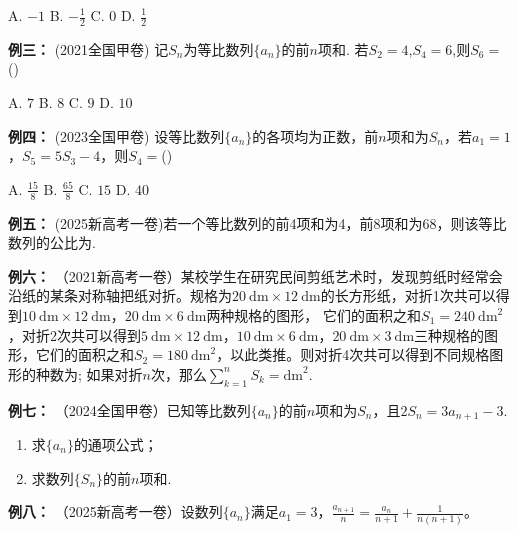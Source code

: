 \documentclass{article}
\begin{document}
\vspace{1em}
A. $-1$ \quad
B. $-\frac{1}{2}$ \quad
C. $0$ \quad
D. $\frac{1}{2}$
\vspace{2\baselineskip}


 \noindent \textbf{例三： }(2021全国甲卷) 记$S_n$为等比数列$\{a_n\}$的前$n$项和. 若$S_2=4$,$S_4=6$,则$S_6=$(\;\;\;)

\vspace{1em}
A. $7$ \quad
B. $8$ \quad
C. $9$ \quad
D. $10$
\vspace{2\baselineskip}

\noindent \textbf{例四： }(2023全国甲卷) 设等比数列$\{a_n\}$的各项均为正数，前$n$项和为$S_n$，若$a_1 = 1$，$S_5 = 5S_3 - 4$，则$S_4 =$(\;\;\;)

\vspace{1em}
A. $\frac{15}{8}$ \quad
B. $\frac{65}{8}$ \quad
C. $15$ \quad
D. $40$
\vspace{2\baselineskip}


\noindent \textbf{例五： }(2025新高考一卷)若一个等比数列的前4项和为4，前8项和为68，则该等比数列的公比为\underline{\quad\quad\quad}.
\vspace{2\baselineskip}

\noindent \textbf{例六： }（2021新高考一卷）某校学生在研究民间剪纸艺术时，发现剪纸时经常会沿纸的某条对称轴把纸对折。规格为$20\ \mathrm{dm} \times 12\ \mathrm{dm}$的长方形纸，对折1次共可以得到$10\ \mathrm{dm} \times 12\ \mathrm{dm}$，$20\ \mathrm{dm} \times 6\ \mathrm{dm}$两种规格的图形，
它们的面积之和$S_1 = 240\ \mathrm{dm}^2$，对折2次共可以得到$5\ \mathrm{dm} \times 12\ \mathrm{dm}$，$10\ \mathrm{dm} \times 6\ \mathrm{dm}$，$20\ \mathrm{dm} \times 3\ \mathrm{dm}$三种规格的图形，它们的面积之和$S_2 = 180\ \mathrm{dm}^2$，以此类推。则对折4次共可以得到不同规格图形的种数为\underline{\quad\quad\quad}; 
如果对折$n$次，那么$\displaystyle\sum_{k=1}^n S_k =$\underline{\quad\quad\quad}$\mathrm{dm}^2$.
\vspace{2\baselineskip}

\noindent \textbf{例七： }（2024全国甲卷）已知等比数列$\{a_n\}$的前$n$项和为$S_n$，且$2S_n = 3a_{n+1} - 3$.

\begin{enumerate}[label=(\Roman*)]
    \item 求$\{a_n\}$的通项公式；
    \item 求数列$\{S_n\}$的前$n$项和.
\end{enumerate}
\newpage

\noindent \textbf{例八： }（2025新高考一卷）设数列$\{a_n\}$满足$a_1 = 3$，$\frac{a_{n+1}}{n} = \frac{a_n}{n+1} + \frac{1}{n(n+1)}$。
\end{document}
